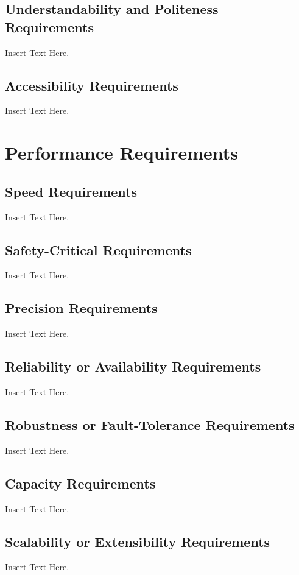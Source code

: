 \documentclass [12pt]{article}
\begin{document}
\subsection{Understandability and Politeness Requirements}
Insert Text Here.
		
\subsection{Accessibility Requirements }
Insert Text Here.
 
\section{Performance Requirements}
\subsection{Speed Requirements }
Insert Text Here. 

\subsection{Safety-Critical Requirements }
		Insert Text Here. 	

\subsection{Precision Requirements}
		Insert Text Here.

\subsection{Reliability or Availability  Requirements}
		Insert Text Here.

\subsection{Robustness or Fault-Tolerance Requirements }

		Insert Text Here.
\subsection{Capacity Requirements }
		Insert Text Here.

\subsection{Scalability or Extensibility Requirements }
		Insert Text Here. 
		
\end{document}
